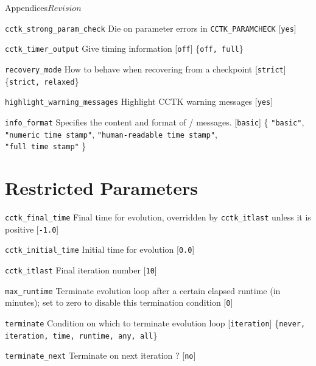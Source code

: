 \begin{cactuspart}{Appendices}{}{$Revision$}
\begin{Lentry}
\item[{\tt cctk\_strong\_param\_check}]
Die on parameter errors in {\tt CCTK\_PARAMCHECK} [{\tt yes}]

\item[{\tt cctk\_timer\_output}]
Give timing information [{\tt off}] \{{\tt off, full}\}

\item[{\tt recovery\_mode}]
How to behave when recovering from a checkpoint [{\tt strict}] \{{\tt strict, relaxed}\}

\item[{\tt highlight\_warning\_messages}]
Highlight CCTK warning messages [{\tt yes}]

\item[{\tt info\_format}]
Specifies the content and format of /
messages. [{\tt basic}]
\{%
\hbox{{\tt "basic"}},
\hbox{{\tt "numeric time stamp"}},
\hbox{{\tt "human-readable time stamp"}},\\
\hbox{{\tt "full time stamp"}}%
\}

\end{Lentry}

\section{Restricted Parameters}

\begin{Lentry}

\item [{\tt cctk\_final\_time}] Final time for evolution, overridden by
{\tt cctk\_itlast} unless it is positive [{\tt -1.0}]

\item[{\tt cctk\_initial\_time}]
Initial time for evolution [{\tt 0.0}]

\item [{\tt cctk\_itlast}]
Final iteration number [{\tt 10}]

\item [{\tt max\_runtime}]
Terminate evolution loop after a certain elapsed runtime (in minutes); set to zero to disable this termination condition [{\tt 0}]

\item [{\tt terminate}]
Condition on which to terminate evolution loop [{\tt iteration}] \{{\tt never, iteration, time, runtime, any, all}\}

\item [{\tt terminate\_next}]
Terminate on next iteration ? [{\tt no}]


\end{Lentry}
\end{cactuspart}
